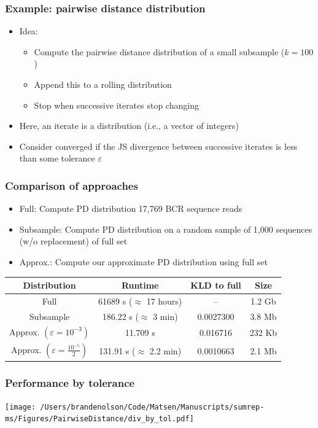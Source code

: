 \documentclass[mathserif,compress]{beamer}
\newcommand*\eps{\epsilon}
\renewcommand\;{\,}
\renewcommand\epsilon{\varepsilon}
\begin{document}
\begin{frame}\frametitle{Example: pairwise distance distribution}
\begin{itemize}
\item Idea:
\begin{itemize}
\item
Compute the pairwise distance distribution of a small subsample ($k = 100$)
\item
Append this to a rolling distribution
\item
Stop when successive iterates stop changing
\end{itemize}
\item
Here, an iterate is a distribution (i.e., a vector of integers)
\bigskip
\item
Consider converged if the JS divergence between successive iterates is less than some tolerance $\eps$
\end{itemize}
\end{frame}

\begin{frame}\frametitle{Comparison of approaches}
\begin{center}
\begin{itemize}
\item Full: Compute PD distribution 17,769 BCR sequence reads
\item Subsample: Compute PD distribution on a random sample of 1,000 sequences (w/o replacement) of full set
\item Approx.: Compute our approximate PD distribution using full set
\end{itemize}
\bigskip
\begin{tabular}{c|c|c|c}
Distribution & Runtime & KLD to full & Size \\
\hline
Full & 61689 s ($\approx$ 17 hours) &  -- & 1.2 Gb \\
Subsample & 186.22 s ($\approx$ 3 min) & 0.0027300 & 3.8 Mb \\
Approx. $\left(\eps = 10^{-3}\right)$ & 11.709 s & 0.016716 & 232 Kb\\
Approx. $\left(\eps = \frac{10^{-5}}{2}\right)$ & 131.91 s ($\approx$ 2.2 min) & 0.0010663 & 2.1 Mb
\end{tabular}
\end{center}
\end{frame}

\begin{frame}\frametitle{Performance by tolerance}
\begin{center}
\texttt{[image: /Users/brandenolson/Code/Matsen/Manuscripts/sumrep-ms/Figures/PairwiseDistance/div\_by\_tol.pdf]}
\end{center}
\end{frame}
\end{document}
